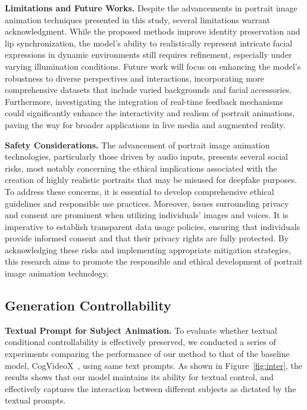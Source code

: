 \noindent\textbf{Limitations and Future Works.}
Despite the advancements in portrait image animation techniques presented in this study, several limitations warrant acknowledgment. 
While the proposed methods improve identity preservation and lip synchronization, the model's ability to realistically represent intricate facial expressions in dynamic environments still requires refinement, especially under varying illumination conditions. 
Future work will focus on enhancing the model's robustness to diverse perspectives and interactions, incorporating more comprehensive datasets that include varied backgrounds and facial accessories. 
Furthermore, investigating the integration of real-time feedback mechanisms could significantly enhance the interactivity and realism of portrait animations, paving the way for broader applications in live media and augmented reality.

\noindent\textbf{Safety Considerations.}
The advancement of portrait image animation technologies, particularly those driven by audio inputs, presents several social risks, most notably concerning the ethical implications associated with the creation of highly realistic portraits that may be misused for deepfake purposes. 
To address these concerns, it is essential to develop comprehensive ethical guidelines and responsible use practices.
Moreover, issues surrounding privacy and consent are prominent when utilizing individuals' images and voices. It is imperative to establish transparent data usage policies, ensuring that individuals provide informed consent and that their privacy rights are fully protected.
By acknowledging these risks and implementing appropriate mitigation strategies, this research aims to promote the responsible and ethical development of portrait image animation technology.

\subsection{Generation Controllability}

\noindent\textbf{Textual Prompt for Subject Animation.}
To evaluate whether textual conditional controllability is effectively preserved, we conducted a series of experiments comparing the performance of our method to that of the baseline model, CogVideoX~\cite{yang2024cogvideox}, using same text prompts. As shown in Figure~\ref{fig:inter}, the results shows that our model maintains its ability for textual control, and effectively captures the interaction between different subjects as dictated by the textual prompts.

